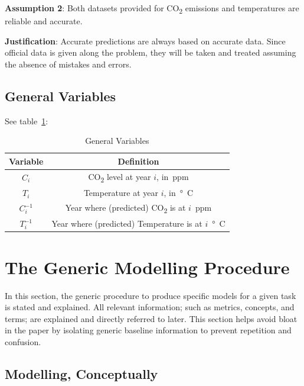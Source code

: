 \documentclass[12pt]{mcmthesis}
\begin{document}
    \noindent\textbf{Assumption 2}: Both datasets provided for CO\textsubscript{2} emissions and temperatures are reliable and accurate.

    \vspace{-6pt}
    \noindent\textbf{Justification}: Accurate predictions are always based on accurate data. Since official data is given along the problem, they will be taken and treated assuming the absence of mistakes and errors.

    \subsection{General Variables}
    See table~\ref{tab:my_label}:

    \begin{table}[h!]
        \centering
        \begin{tabular}{cc}
            \toprule
            Variable   & Definition                                                    \\
            \midrule
            $C_i$      & CO\textsubscript{2} level at year $i$, in~\si{ppm}            \\
            $T_i$      & Temperature at year $i$, in~\si{\degree C}                    \\
            $C^{-1}_i$ & Year where (predicted) CO\textsubscript{2} is at $i$~\si{ppm} \\
            $T^{-1}_i$ & Year where (predicted) Temperature is at $i$~\si{\degree C}   \\
            \bottomrule
        \end{tabular}
        \vspace{8pt}
        \caption{General Variables}
        \label{tab:my_label}
    \end{table}


    \section{The Generic Modelling Procedure}
    In this section, the generic procedure to produce specific models for a given task is stated and explained. All relevant information; such as metrics, concepts, and terms; are explained and directly referred to later. This section helps avoid bloat in the paper by isolating generic baseline information to prevent repetition and confusion.

    \subsection*{Modelling, Conceptually}
\end{document}
